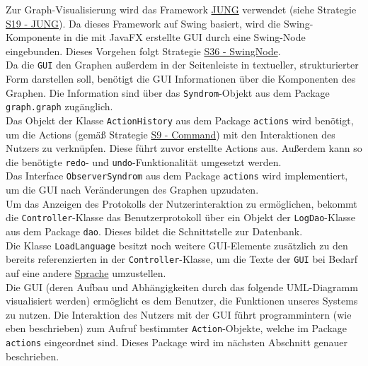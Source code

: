 \documentclass[enabledeprecatedfontcommands,fontsize=11pt,paper=a4,twoside]{scrartcl}
\newcounter{one}
\begin{document}
	Zur Graph-Visualisierung wird das Framework \hyperlink{eee}{JUNG} verwendet (siehe Strategie \hyperlink{eee}{S19 - JUNG}). Da dieses Framework auf Swing basiert, wird die Swing-Komponente in die mit JavaFX erstellte GUI durch eine Swing-Node eingebunden. Dieses Vorgehen folgt Strategie \hyperlink{lll}{S36 - SwingNode}.\\
	
	Da die \texttt{GUI} den Graphen außerdem in der Seitenleiste in textueller, strukturierter Form darstellen soll, benötigt die GUI Informationen über die Komponenten des Graphen. Die Information sind über das \texttt{Syndrom}-Objekt aus dem Package \texttt{graph.graph} zugänglich. \\
	
	Das Objekt der Klasse \texttt{ActionHistory} aus dem Package \texttt{actions} wird benötigt, um die Actions (gemäß Strategie \hyperlink{command}{S9 - Command}) mit den Interaktionen des Nutzers zu verknüpfen. Diese führt zuvor erstellte Actions aus. Außerdem kann so die benötigte \texttt{redo}- und \texttt{undo}-Funktionalität umgesetzt werden. \\
	
	Das Interface \texttt{ObserverSyndrom} aus dem Package \texttt{actions} wird implementiert, um die GUI nach Veränderungen des Graphen upzudaten.\\
	
	Um das Anzeigen des Protokolls der Nutzerinteraktion zu ermöglichen, bekommt die \texttt{Controller}-Klasse das Benutzerprotokoll über ein Objekt der \texttt{LogDao}-Klasse aus dem Package \texttt{dao}. Dieses bildet die Schnittstelle zur Datenbank. \\
	
	Die Klasse \texttt{LoadLanguage} besitzt noch weitere GUI-Elemente zusätzlich zu den bereits referenzierten in der \texttt{Controller}-Klasse, um die Texte der \texttt{GUI} bei Bedarf auf eine andere \hyperlink{hh}{Sprache} umzustellen. \\
	
	Die GUI (deren Aufbau und Abhängigkeiten durch das folgende UML-Diagramm visualisiert werden) ermöglicht es dem Benutzer, die Funktionen unseres Systems zu nutzen. Die Interaktion des Nutzers mit der GUI führt programmintern (wie eben beschrieben) zum Aufruf bestimmter \texttt{Action}-Objekte, welche im Package \texttt{actions} eingeordnet sind. Dieses Package wird im nächsten Abschnitt genauer beschrieben.
	
	
	\newpage
	
	
\end{document}
